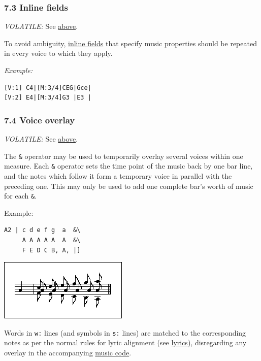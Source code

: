 \documentclass[oneside]{book}
\begin{document}
\hypertarget{inline_fields}{\subsubsection{7.3 Inline
fields}\label{inline_fields}}

\emph{VOLATILE:} See \protect\hyperlink{multiple_voices}{above}.

To avoid ambiguity, \protect\hyperlink{inline_field_definition}{inline
fields} that specify music properties should be repeated in every voice
to which they apply.

\emph{Example:}

\begin{verbatim}
[V:1] C4|[M:3/4]CEG|Gce|
[V:2] E4|[M:3/4]G3 |E3 |
\end{verbatim}

\hypertarget{voice_overlay}{\subsubsection{7.4 Voice
overlay}\label{voice_overlay}}

\emph{VOLATILE:} See \protect\hyperlink{multiple_voices}{above}.

The \texttt{\&} operator may be used to temporarily overlay several
voices within one measure. Each \texttt{\&} operator sets the time point
of the music back by one bar line, and the notes which follow it form a
temporary voice in parallel with the preceding one. This may only be
used to add one complete bar's worth of music for each \texttt{\&}.

Example:

\begin{verbatim}
A2 | c d e f g  a  &\
     A A A A A  A  &\
     F E D C B, A, |]
\end{verbatim}

\href{/wiki/_detail/abc:standard:overlay1-80.png?id=abc\%3Astandard\%3Av2.1}{\includegraphics{wiki/_media/abc-standard-overlay1-80.png}}

Words in \texttt{w:} lines (and symbols in \texttt{s:} lines) are
matched to the corresponding notes as per the normal rules for lyric
alignment (see \protect\hyperlink{lyrics}{lyrics}), disregarding any
overlay in the accompanying
\protect\hyperlink{music_code_definition}{music code}.
\end{document}
